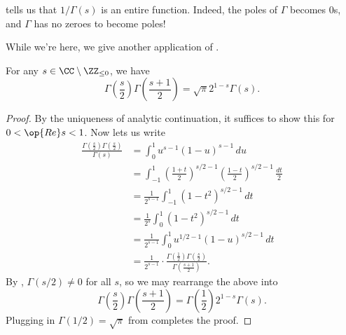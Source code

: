 \documentclass[../notes.tex]{subfiles}
\begin{document}
\begin{remark}
	 tells us that $1/\Gamma(s)$ is an entire function. Indeed, the poles of $\Gamma$ becomes $0$s, and $\Gamma$ has no zeroes to become poles!
\end{remark}
While we're here, we give another application of .
\begin{proposition} \label{prop:duplicate-gamma}
	For any $s\in\CC\setminus\ZZ_{\le0}$, we have
	\[\Gamma\left(\frac s2\right)\Gamma\left(\frac{s+1}2\right)=\sqrt\pi2^{1-s}\Gamma(s).\]
\end{proposition}
\begin{proof}
	By the uniqueness of analytic continuation, it suffices to show this for $0<\op{Re}s<1$. Now  lets us write
	\begin{align*}
		\frac{\Gamma\left(\frac s2\right)\Gamma\left(\frac s2\right)}{\Gamma(s)} &= \int_0^1u^{s-1}(1-u)^{s-1}\,du \\
		&= \int_{-1}^1\left(\frac{1+t}2\right)^{s/2-1}\left(\frac{1-t}2\right)^{s/2-1}\,\frac{dt}2 \\
		&= \frac1{2^{s-1}}\int_{-1}^1\left(1-t^2\right)^{s/2-1}\,dt \\
		&= \frac1{2^s}\int_0^1\left(1-t^2\right)^{s/2-1}\,dt \\
		&= \frac1{2^{s-1}}\int_0^1u^{1/2-1}(1-u)^{s/2-1}\,dt \\
		&= \frac1{2^{s-1}}\cdot\frac{\Gamma\left(\frac12\right)\Gamma\left(\frac s2\right)}{\Gamma\left(\frac{s+1}2\right)}.
	\end{align*}
	By , $\Gamma(s/2)\ne0$ for all $s$, so we may rearrange the above into
	\[\Gamma\left(\frac s2\right)\Gamma\left(\frac{s+1}2\right)=\Gamma\left(\frac12\right)2^{1-s}\Gamma(s).\]
	Plugging in $\Gamma(1/2)=\sqrt\pi$ from  completes the proof.
\end{proof}
\end{document}
